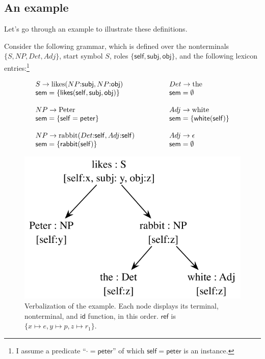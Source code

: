 \documentclass[11pt,a4]{article}
\newcommand{\self}{\mathsf{self}}
\newcommand{\Neq}{{:}}
\newcommand{\refr}{\mathsf{ref}}
\newcommand{\id}{\mathsf{id}}
\theoremstyle{plain}
\theoremstyle{definition}
\begin{document}
\subsection{An example} \label{sec:rgg-example}

Let's go through an example to illustrate these definitions.

Consider the following grammar, which is defined over the nonterminals
$\{S, NP, Det, Adj\}$, start symbol $S$, roles $\{\self,
\mathsf{subj}, \mathsf{obj}\}$, and the following lexicon
entries:\footnote{I assume a predicate ``$\cdot = \mathsf{peter}$'' of
  which  $\self = \mathsf{peter}$ is an instance.}

$$\begin{array}{lp{1cm}l}
S \rightarrow \mathrm{likes}(NP \Neq \mathsf{subj}, NP \Neq
\mathsf{obj}) 
&&
Det \rightarrow \mathrm{the} \\
\mathsf{sem} = \{ \mathsf{likes}(\self, \mathsf{subj}, \mathsf{obj})
\} 
&&
\mathsf{sem} = \emptyset \\
&&\\
%
%
NP \rightarrow \mathrm{Peter} 
&&
Adj \rightarrow \mathrm{white} \\
\mathsf{sem} = \{ \self = \mathsf{peter} \}
&&
\mathsf{sem} = \{ \mathsf{white}(\self) \} \\
&&\\
%
%
NP \rightarrow \mathrm{rabbit}(Det \Neq \self, Adj \Neq \mathsf{self})
&&
Adj \rightarrow \epsilon \\
\mathsf{sem} = \{ \mathsf{rabbit}(\self) \}
&&
\mathsf{sem} = \emptyset
\end{array}
$$

\begin{figure}
  \centering
  \includegraphics[scale=0.6]{pic-rdg-crisp}
  \caption{Verbalization of the example. Each node displays its
    terminal, nonterminal, and $\id$ function, in this order. $\refr$
    is $\{x \mapsto e, y \mapsto p, z \mapsto r_1\}$.}
  \label{fig:rdg-crisp}
\end{figure}
\end{document}
